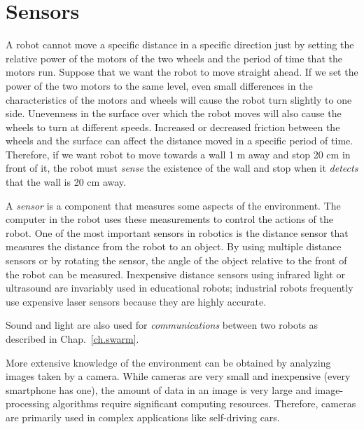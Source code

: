 
\chapter{Sensors}\label{ch.sensors}


A robot cannot move a specific distance in a specific direction just by setting the relative power of the motors of the two wheels and the period of time that the motors run. Suppose that we want the robot to move straight ahead. If we set the power of the two motors to the same level, even small differences in the characteristics of the motors and wheels will cause the robot turn slightly to one side. Unevenness in the surface over which the robot moves will also cause the wheels to turn at different speeds. Increased or decreased friction between the wheels and the surface can affect the distance moved in a specific period of time. Therefore, if we want  robot to move towards a wall 1 m away and stop 20 cm in front of it, the robot must \emph{sense} the existence of the wall and stop when it \emph{detects} that the wall is 20 cm away.

A \emph{sensor} is a component that measures some aspects of the environment. The computer in the robot uses these measurements to control the actions of the robot. One of the most important sensors in robotics is the distance sensor that measures the distance from the robot to an object. By using multiple distance sensors or by rotating the sensor, the angle of the object relative to the front of the robot can be measured. Inexpensive distance sensors using infrared light or ultrasound are invariably used in educational robots; industrial robots frequently use expensive laser sensors because they are highly accurate.

Sound and light are also used for \emph{communications} between two robots as described in Chap.~\ref{ch.swarm}.

More extensive knowledge of the environment can be obtained by analyzing images taken by a camera. While cameras are very small and inexpensive (every smartphone has one), the amount of data in an image is very large and image-processing algorithms require significant computing resources. Therefore, cameras are primarily used in complex applications like self-driving cars.

